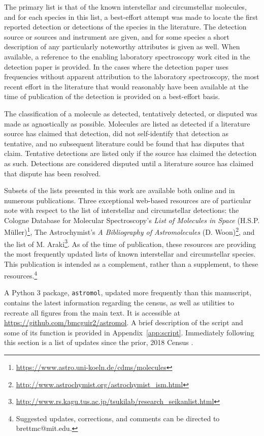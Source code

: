 \documentclass[twocolumn]{aastex631}
\newcommand{\update}[1]{{#1}}
\begin{document}
The primary list is that of the known interstellar and circumstellar molecules, and for each species in this list, a best-effort attempt was made to locate the first reported detection or detections of the species in the literature.  The detection source or sources and instrument are given, and for some species a short description of any particularly noteworthy attributes is given as well. When available, a reference to the enabling laboratory spectroscopy work cited in the detection paper is provided.  In the cases where the detection paper uses frequencies without apparent attribution to the laboratory spectroscopy, the most recent effort in the literature that would reasonably have been available at the time of publication of the detection is provided on a best-effort basis.

The classification of a molecule as detected, tentatively detected, or disputed was made as agnostically as possible.  Molecules are listed as detected if a literature source has claimed that detection, did not self-identify that detection as tentative, and no subsequent literature could be found that has disputes that claim.  Tentative detections are listed only if the source has claimed the detection as such.  Detections are considered disputed until a literature source has claimed that dispute has been resolved.

Subsets of the lists presented in this work are available both online and in numerous publications.  Three exceptional web-based resources are of particular note with respect to the list of interstellar and circumstellar detections: the Cologne Database for Molecular Spectroscopy's \emph{List of Molecules in Space} (H.S.P. M\"{u}ller)\footnote{\url{https://www.astro.uni-koeln.de/cdms/molecules}}, The Astrochymist's \emph{A Bibliography of Astromolecules} (D. Woon)\footnote{\url{http://www.astrochymist.org/astrochymist_ism.html}}, and the list of M. Araki\footnote{\url{http://www.rs.kagu.tus.ac.jp/tsukilab/research_seikanlist.html}}.  As of the time of publication, these resources are providing the most frequently updated lists of known interstellar and circumstellar species.  This publication is intended as a complement, rather than a supplement, to these resources.\footnote{Suggested updates, corrections, and comments can be directed to \update{brettmc@mit.edu}.}

\update{A Python 3 package, \texttt{astromol}, updated more frequently than this manuscript, contains the latest information regarding the census, as well as utilities to recreate all figures from the main text.  It is accessible at \href{https://github.com/bmcguir2/astromol}{\url{https://github.com/bmcguir2/astromol}}}.   A brief description of the script and some of its function is provided in Appendix~\ref{app:script}.  \update{Immediately following this section is a list of updates since the prior, 2018 Census \citep{McGuire:2018mc}.}
\end{document}

